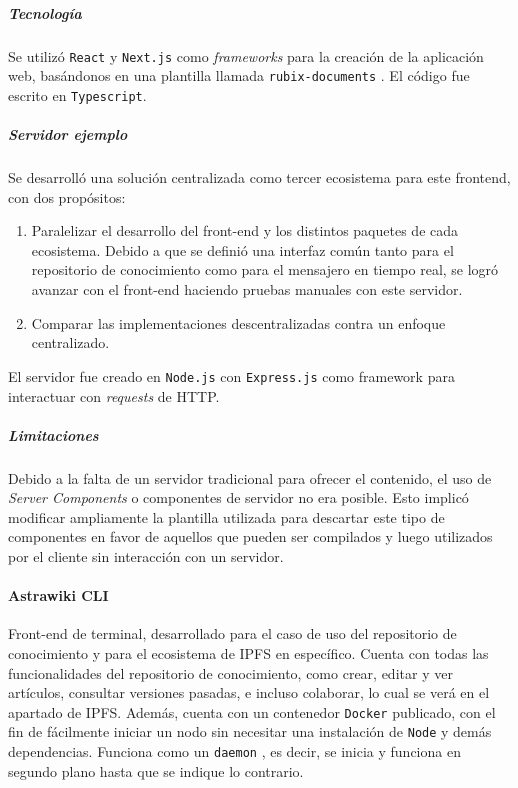 \subparagraph{Tecnología} Se utilizó \texttt{React} \cite{react} y \texttt{Next.js} \cite{next} como \textit{frameworks} para la creación de la aplicación web, basándonos en una plantilla llamada \texttt{rubix-documents} \cite{rubix}. El código fue escrito en \texttt{Typescript}.

\subparagraph{Servidor ejemplo} Se desarrolló una solución centralizada como tercer ecosistema para este frontend, con dos propósitos:
\begin{enumerate}
    \item Paralelizar el desarrollo del front-end y los distintos paquetes de cada ecosistema. Debido a que se definió una interfaz común tanto para el repositorio de conocimiento como para el mensajero en tiempo real, se logró avanzar con el front-end haciendo pruebas manuales con este servidor.
    \item Comparar las implementaciones descentralizadas contra un enfoque centralizado.
\end{enumerate}
El servidor fue creado en \texttt{Node.js} con \texttt{Express.js} como framework para interactuar con \textit{requests} de HTTP.

\subparagraph{Limitaciones} Debido a la falta de un servidor tradicional para ofrecer el contenido, el uso de \textit{Server Components} o componentes de servidor \cite{server-components} no era posible. Esto implicó modificar ampliamente la plantilla utilizada para descartar este tipo de componentes en favor de aquellos que pueden ser compilados y luego utilizados por el cliente sin interacción con un servidor.

\paragraph{Astrawiki CLI}

Front-end de terminal, desarrollado para el caso de uso del repositorio de conocimiento y para el ecosistema de IPFS en específico. Cuenta con todas las funcionalidades del repositorio de conocimiento, como crear, editar y ver artículos, consultar versiones pasadas, e incluso colaborar, lo cual se verá en el apartado de IPFS. Además, cuenta con un contenedor \texttt{Docker} publicado, con el fin de fácilmente iniciar un nodo sin necesitar una instalación de \texttt{Node} y demás dependencias. Funciona como un \texttt{daemon} \cite{daemon}, es decir, se inicia y funciona en segundo plano hasta que se indique lo contrario.

